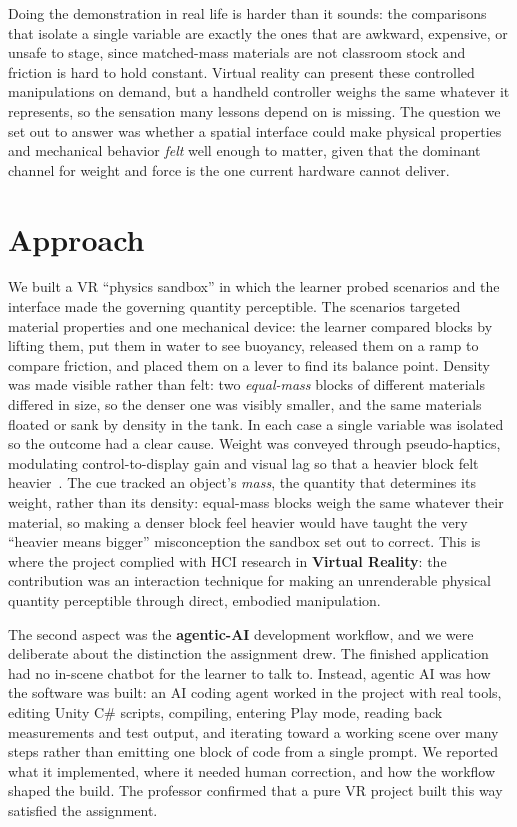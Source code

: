 \documentclass[sigconf,nonacm]{acmart}
\begin{document}
Doing the demonstration in real life is harder than it sounds: the comparisons that
isolate a single variable are exactly the ones that are awkward, expensive, or unsafe
to stage, since matched-mass materials are not classroom stock and friction is hard
to hold constant. Virtual reality can present these controlled manipulations on
demand, but a handheld controller weighs the same whatever it represents, so the
sensation many lessons depend on is missing. The question we set out to answer was
whether a spatial interface could make physical properties and mechanical behavior
\emph{felt} well enough to matter, given that the dominant channel for weight and
force is the one current hardware cannot deliver.



\section{Approach}
We built a VR ``physics sandbox'' in which the learner probed scenarios and the
interface made the governing quantity perceptible. The scenarios targeted material
properties and one mechanical device: the learner compared blocks by lifting them,
put them in water to see buoyancy, released them on a ramp to compare friction, and
placed them on a lever to find its balance point. Density was made visible rather than
felt: two \emph{equal-mass} blocks of different materials differed in size, so the
denser one was visibly smaller, and the same materials floated or sank by density in
the tank. In each case a single variable was isolated so the outcome had a clear
cause. Weight was conveyed through pseudo-haptics, modulating control-to-display gain
and visual lag so that a heavier block felt
heavier~\cite{ujitoko2021pseudo, dominjon2005influence, rietzler2018breaking}. The cue
tracked an object's \emph{mass}, the quantity that determines its weight, rather than
its density: equal-mass blocks weigh the same whatever their material, so making a
denser block feel heavier would have taught the very ``heavier means bigger''
misconception the sandbox set out to correct. This is where the project complied with
HCI research in \textbf{Virtual Reality}: the contribution was an interaction technique
for making an unrenderable physical quantity perceptible through direct, embodied
manipulation.

The second aspect was the \textbf{agentic-AI} development workflow, and we were
deliberate about the distinction the assignment drew. The finished application had no
in-scene chatbot for the learner to talk to. Instead, agentic AI was how the software
was built: an AI coding agent worked in the project with real tools, editing Unity
C\# scripts, compiling, entering Play mode, reading back measurements and test output,
and iterating toward a working scene over many steps rather than emitting one block of
code from a single prompt. We reported what it implemented, where it needed human
correction, and how the workflow shaped the build. The professor confirmed that a pure
VR project built this way satisfied the assignment.
\end{document}
